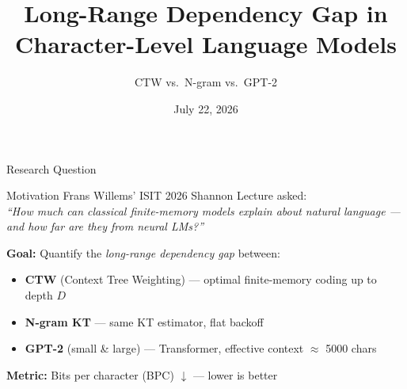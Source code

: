 \documentclass[aspectratio=169, 10pt]{beamer}
\title[Long-Range Dependency Gap]{Long-Range Dependency Gap in\\
  Character-Level Language Models}
\subtitle{CTW vs.\ N-gram vs.\ GPT-2}
\date{July 22, 2026}
\begin{document}
\begin{frame}
  \titlepage
\end{frame}

\begin{frame}{Research Question}

  \begin{block}{Motivation}
    Frans Willems' ISIT 2026 Shannon Lecture asked:\\
    \textit{``How much can classical finite-memory models explain about
    natural language — and how far are they from neural LMs?''}
  \end{block}

  \bigskip
  \textbf{Goal:} Quantify the \emph{long-range dependency gap} between:
  \begin{itemize}
    \item \textcolor{ctwblue}{\textbf{CTW}} (Context Tree Weighting) — optimal
          finite-memory coding up to depth $D$
    \item \textcolor{ngramred}{\textbf{N-gram KT}} — same KT estimator, flat backoff
    \item \textcolor{gpt2green}{\textbf{GPT-2}} (small \& large) — Transformer,
          effective context $\approx$ 5000 chars
  \end{itemize}

  \bigskip
  \textbf{Metric:} Bits per character (BPC) $\downarrow$ — lower is better
\end{frame}
\end{document}
